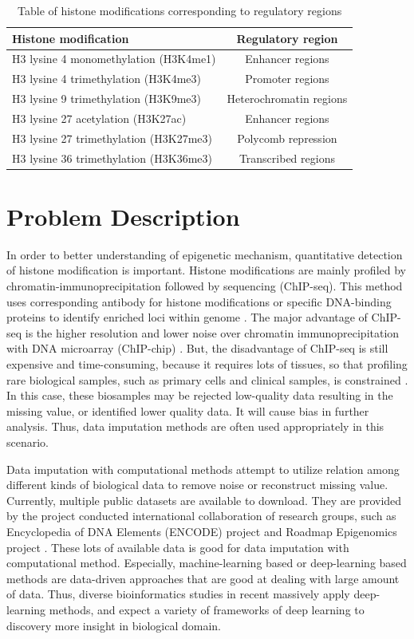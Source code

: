 \begin{table}[H]
    \centering
    \begin{tabular}{lc}
        \hline
        Histone modification    & Regulatory region \\\hline
        H3 lysine 4 monomethylation (H3K4me1) & Enhancer regions \\
        H3 lysine 4 trimethylation (H3K4me3)   & Promoter regions \\
        H3 lysine 9 trimethylation (H3K9me3) & Heterochromatin regions \\
        H3 lysine 27 acetylation (H3K27ac) & Enhancer regions \\
        H3 lysine 27 trimethylation (H3K27me3) & Polycomb repression \\
        H3 lysine 36 trimethylation (H3K36me3) & Transcribed regions \\\hline
    \end{tabular}
    \captionsetup{labelfont=bf}
    \caption{Table of histone modifications corresponding to regulatory regions}
    \label{t1}
\end{table}


\section{Problem Description}
In order to better understanding of epigenetic mechanism, quantitative detection of histone modification is important. Histone modifications are mainly profiled by chromatin-immunoprecipitation followed by sequencing (ChIP-seq). This method uses corresponding antibody for histone modifications or specific DNA-binding proteins to identify enriched loci within genome \cite{nakato2020methods}. The major advantage of ChIP-seq is the higher resolution and lower noise over chromatin immunoprecipitation with DNA microarray (ChIP-chip) \cite{massie2012mapping}. But, the disadvantage of ChIP-seq is still expensive and time-consuming, because it requires lots of tissues, so that profiling rare biological samples, such as primary cells and clinical samples, is constrained \cite{gilfillan2012limitations}. In this case, these biosamples may be rejected low-quality data resulting in the missing value, or identified lower quality data. It will cause bias in further analysis. Thus, data imputation methods are often used appropriately in this scenario.

Data imputation with computational methods attempt to utilize relation among different kinds of biological data to remove noise or reconstruct missing value. Currently, multiple public datasets are available to download. They are provided by the project conducted international collaboration of research groups, such as Encyclopedia of DNA Elements (ENCODE) project \cite{davis2018encyclopedia} and Roadmap Epigenomics project \cite{kundaje2015integrative}. These lots of available data is good for data imputation with computational method. Especially, machine-learning based or deep-learning based methods are data-driven approaches that are good at dealing with large amount of data. Thus, diverse bioinformatics studies in recent massively apply deep-learning methods, and expect a variety of frameworks of deep learning to discovery more insight in biological domain.

